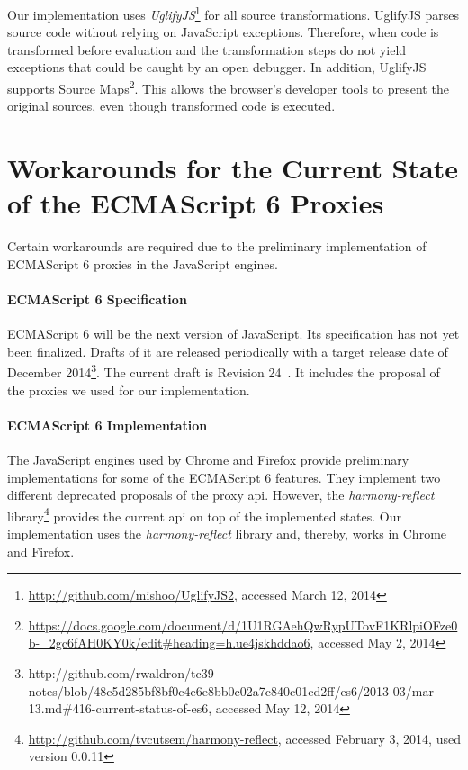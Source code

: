 Our implementation uses \emph{UglifyJS}\footnote{\url{http://github.com/mishoo/UglifyJS2}, accessed March 12, 2014} for all source transformations.
UglifyJS parses source code without relying on JavaScript exceptions.
Therefore, when code is transformed before evaluation and the transformation steps do not yield exceptions that could be caught by an open debugger.
In addition, UglifyJS supports Source Maps\footnote{\url{https://docs.google.com/document/d/1U1RGAehQwRypUTovF1KRlpiOFze0b-_2gc6fAH0KY0k/edit\#heading=h.ue4jskhddao6}, accessed May 2, 2014}.
This allows the browser's developer tools to present the original sources, even though transformed code is executed.





\section{Workarounds for the Current State of the ECMAScript 6 Proxies} \label{sec:IMPLEMENTATION:4}


Certain workarounds are required due to the preliminary implementation of ECMAScript 6 proxies in the JavaScript engines.

\paragraph{ECMAScript 6 Specification}
ECMAScript 6 will be the next version of JavaScript.
Its specification has not yet been finalized.
Drafts of it are released periodically with a target release date of December 2014\footnote{http://github.com/rwaldron/tc39-notes/blob/48c5d285bf8bf0c4e6e8bb0c02a7c840c01cd2ff/es6/2013-03/mar-13.md\#416-current-status-of-es6, accessed May 12, 2014}.
The current draft is Revision 24~\cite{Ecma2014ES6}.
It includes the proposal of the proxies we used for our implementation.

\paragraph{ECMAScript 6 Implementation}
The JavaScript engines used by Chrome and Firefox provide preliminary implementations for some of the ECMAScript 6 features.
They implement two different deprecated proposals of the proxy \ac{api}.
However, the \emph{harmony-reflect} library\footnote{\url{http://github.com/tvcutsem/harmony-reflect}, accessed February 3, 2014, used version 0.0.11} provides the current \ac{api} on top of the implemented states.
Our implementation uses the \emph{harmony-reflect} library and, thereby, works in Chrome and Firefox.


